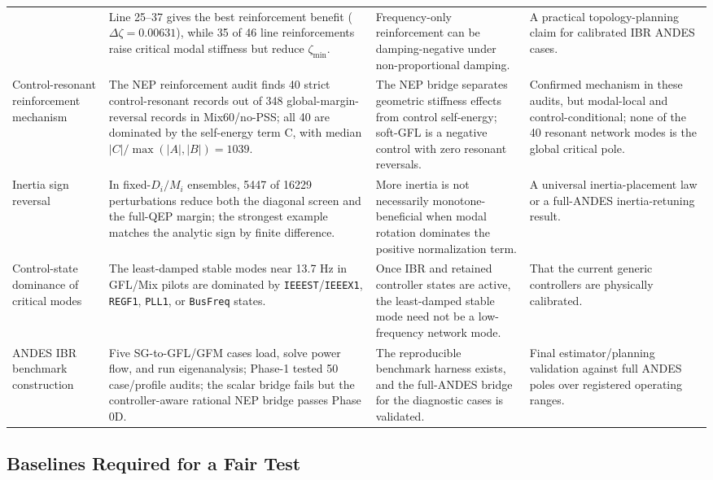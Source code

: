 \documentclass[journal]{IEEEtran}
\begin{document}
\begin{table}[t]
\begin{tabular}{@{}p{}p{}p{}p{}@{}}
& Line 25--37 gives the best reinforcement benefit ($\Delta\zeta=0.00631$), while 35 of 46 line reinforcements raise critical modal stiffness but reduce $\zeta_{\min}$.
& Frequency-only reinforcement can be damping-negative under non-proportional damping.
& A practical topology-planning claim for calibrated IBR ANDES cases.\\
Control-resonant reinforcement mechanism
& The NEP reinforcement audit finds 40 strict control-resonant records out of 348 global-margin-reversal records in Mix60/no-PSS; all 40 are dominated by the self-energy term C, with median $|C|/\max(|A|,|B|)=1039$.
& The NEP bridge separates geometric stiffness effects from control self-energy; soft-GFL is a negative control with zero resonant reversals.
& Confirmed mechanism in these audits, but modal-local and control-conditional; none of the 40 resonant network modes is the global critical pole.\\
Inertia sign reversal
& In fixed-$D_i/M_i$ ensembles, 5447 of 16229 perturbations reduce both the diagonal screen and the full-QEP margin; the strongest example matches the analytic sign by finite difference.
& More inertia is not necessarily monotone-beneficial when modal rotation dominates the positive normalization term.
& A universal inertia-placement law or a full-ANDES inertia-retuning result.\\
Control-state dominance of critical modes
& The least-damped stable modes near 13.7 Hz in GFL/Mix pilots are dominated by \texttt{IEEEST}/\texttt{IEEEX1}, \texttt{REGF1}, \texttt{PLL1}, or \texttt{BusFreq} states.
& Once IBR and retained controller states are active, the least-damped stable mode need not be a low-frequency network mode.
& That the current generic controllers are physically calibrated.\\
ANDES IBR benchmark construction
& Five SG-to-GFL/GFM cases load, solve power flow, and run eigenanalysis; Phase-1 tested 50 case/profile audits; the scalar bridge fails but the controller-aware rational NEP bridge passes Phase 0D.
& The reproducible benchmark harness exists, and the full-ANDES bridge for the diagnostic cases is validated.
& Final estimator/planning validation against full ANDES poles over registered operating ranges.\\
\bottomrule
\end{tabular}
\end{table}

\subsection{Baselines Required for a Fair Test}
\end{document}
